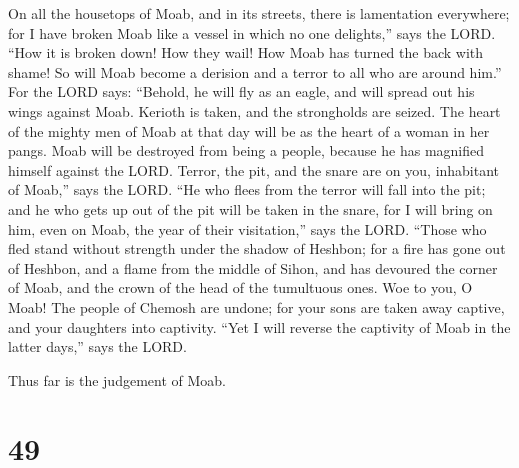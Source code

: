 On all the housetops of Moab, and in its streets, there
is lamentation everywhere; for I have broken Moab like a vessel in which
no one delights,'' says the LORD.  ``How it is broken
down! How they wail! How Moab has turned the back with shame! So will
Moab become a derision and a terror to all who are around him.''
 For the LORD says: ``Behold, he will fly as an eagle,
and will spread out his wings against Moab.  Kerioth is
taken, and the strongholds are seized. The heart of the mighty men of
Moab at that day will be as the heart of a woman in her pangs.
 Moab will be destroyed from being a people, because he
has magnified himself against the LORD.  Terror, the pit,
and the snare are on you, inhabitant of Moab,'' says the LORD.
 ``He who flees from the terror will fall into the pit;
and he who gets up out of the pit will be taken in the snare, for I will
bring on him, even on Moab, the year of their visitation,'' says the
LORD.  ``Those who fled stand without strength under the
shadow of Heshbon; for a fire has gone out of Heshbon, and a flame from
the middle of Sihon, and has devoured the corner of Moab, and the crown
of the head of the tumultuous ones.  Woe to you, O Moab!
The people of Chemosh are undone; for your sons are taken away captive,
and your daughters into captivity.  ``Yet I will reverse
the captivity of Moab in the latter days,'' says the LORD.

Thus far is the judgement of Moab.

\hypertarget{section-48}{%
\section{49}\label{section-48}}

